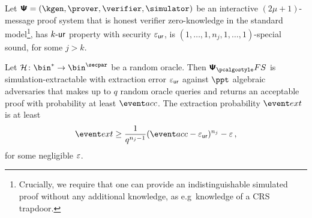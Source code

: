 \let\accentvec\vec \documentclass[runningheads]{llncs}
\begin{document}
\begin{theorem}
\label{thm:se}
Let $\ps = (\kgen, \prover, \verifier, \simulator)$ be an interactive $(2
\mu + 1)$-message proof system that is honest verifier zero-knowledge in the
standard model\footnote{Crucially, we require that one can provide an
		indistinguishable simulated proof without any additional knowledge, as
e.g~knowledge of a CRS trapdoor.}, has ${k\text{-}\mathsf{ur}}$ property with security
$\varepsilon_{\mathsf{ur}}$, is $(1, \ldots, 1, n_j, 1, \ldots, 1)$-special sound, for some $j > k$.

Let $\ro\colon \bin^{*} \to \bin^{\secpar}$ be a random oracle. 
Then $\psfs$ is simulation-extractable with extraction error $\varepsilon_{\mathsf{ur}}$
against $\ppt$ algebraic adversaries that makes up to $q$ random oracle queries and
returns an acceptable proof with probability at least $\accProb$. 
The extraction probability $\extProb$ is at least
\[
	\extProb \geq \frac{1}{q^{n_j - 1}} (\accProb - \epsur)^{n_j} -\eps\,,
\]
for some negligible $\varepsilon$.	
\end{theorem}
\end{document}
